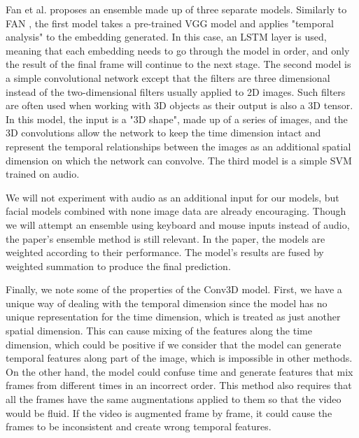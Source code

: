 \documentclass[../main.tex]{subfiles}
\begin{document}
Fan et al. \cite{c3d} proposes an ensemble made up of three separate models. Similarly to FAN \cite{fan},
the first model takes a pre-trained VGG model and applies "temporal analysis" to the embedding generated. In this case,
an LSTM \cite{lstm} layer is used, meaning that each embedding needs to go through the model in order, and only the result of the final frame will
continue to the next stage. The second model is a simple convolutional network except that the filters are three dimensional instead of
the two-dimensional filters usually applied to 2D images. Such filters are often used when working with 3D objects as their output is also a 3D tensor.
In this model, the input is a "3D shape", made up of a series of images, and the 3D convolutions allow the network to keep the time dimension intact
and represent the temporal relationships between the images as an additional spatial dimension on which the network can convolve. The third model
is a simple SVM trained on audio.
\par

We will not experiment with audio as an additional input for our models, but facial models combined with none image data are already encouraging.
Though we will attempt an ensemble using keyboard and mouse inputs instead of audio, the paper's ensemble method is still relevant. In the paper,
the models are weighted according to their performance. The model's results are fused by weighted summation to produce the final prediction. 
\par

Finally, we note some of the properties of the Conv3D model. First, we have a unique way of dealing with the temporal dimension since the model
has no unique representation for the time dimension, which is treated as just another spatial dimension.
This can cause mixing of the features along the time dimension, which could be positive if we consider that the model can generate temporal
features along part of the image, which is impossible in other methods. On the other hand, the model could confuse time and generate features
that mix frames from different times in an incorrect order. This method also requires that all the frames have the same augmentations applied
to them so that the video would be fluid. If the video is augmented frame by frame,
it could cause the frames to be inconsistent and create wrong temporal features.
\end{document}
